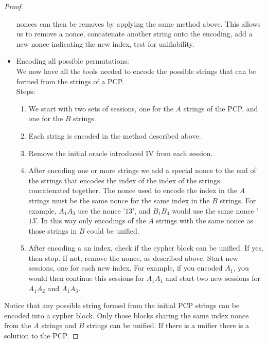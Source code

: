 \documentclass{llncs}
\begin{document}
\begin{proof}
\begin{itemize}
	nonces can then be removes by applying the same method above.
	This allows us to remove a nonce, concatenate another string 
	onto the encoding, add a new nonce indicating the new index, 
	test for unifiability. 
	\item Encoding all possible permutations:\\
	We now have all the tools needed to encode the possible 
	strings that can be formed from the strings of a PCP.\\
	Steps:
	\begin{enumerate}
		\item We start with two sets of sessions, one for the 
		$A$ strings of the PCP, and one for the $B$ strings.
		\item Each string is encoded in the method described above.
		\item Remove the initial oracle introduced IV from each 
		session. 
		\item After encoding one or more strings we add a special 
		nonce to the end of the strings that encodes the index of the 
		index of the strings concatenated together. The nonce used 
		to encode the index in the $A$ strings must be the same nonce
		for the same index in the $B$ strings. For example, 
		$A_1A_3$ use the nonce '$13$', and $B_1B_3$ would use the same
		nonce '$13$'. In this way only encodings of the $A$ strings with the same nonce as those strings in $B$ could be unified.
		\item After encoding a an index, check if the cypher block can be unified. If yes, then stop. If not, remove the nonce, as described above. Start new sessions, one for each new index. 
		For example, if you encoded $A_1$, you would then continue this
		sessions for $A_1A_1$ and start two new sessions for 
		$A_1A_2$ and $A_1A_3$. 
	\end{enumerate}
\end{itemize}
Notice that any possible string formed from the initial PCP strings 
can be encoded into a cypher block. Only those blocks sharing the
same index nonce from the $A$ strings and $B$ strings can be unified.
If there is a unifier there is a solution to the PCP. 
\end{proof}
\end{document}
